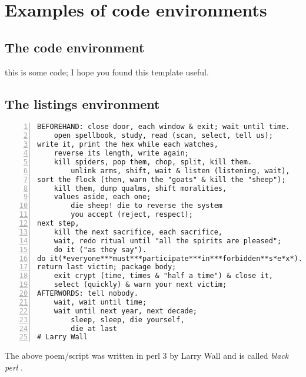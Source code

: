 \chapter{Examples of code environments}
\label{appendix:code}

\section{The code environment}

\begin{code}
this is some code;
I hope you found this template useful.
\end{code}

\section{The listings environment}

\begin{minipage}{\textwidth}
\begin{lstlisting}[numbers=left]
BEFOREHAND: close door, each window & exit; wait until time.
    open spellbook, study, read (scan, select, tell us);
write it, print the hex while each watches,
    reverse its length, write again;
    kill spiders, pop them, chop, split, kill them.
        unlink arms, shift, wait & listen (listening, wait),
sort the flock (then, warn the "goats" & kill the "sheep");
    kill them, dump qualms, shift moralities,
    values aside, each one;
        die sheep! die to reverse the system
        you accept (reject, respect);
next step,
    kill the next sacrifice, each sacrifice,
    wait, redo ritual until "all the spirits are pleased";
    do it ("as they say").
do it(*everyone***must***participate***in***forbidden**s*e*x*).
return last victim; package body;
    exit crypt (time, times & "half a time") & close it,
    select (quickly) & warn your next victim;
AFTERWORDS: tell nobody.
    wait, wait until time;
    wait until next year, next decade;
        sleep, sleep, die yourself,
        die at last
# Larry Wall
\end{lstlisting}
\end{minipage}

The above poem/script was written in perl 3 by Larry Wall and is called \textit{black perl} \cite{blackPerl}.
